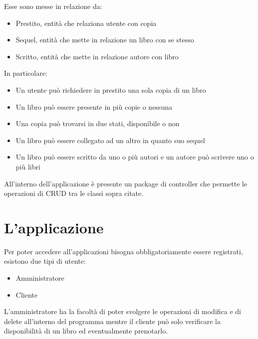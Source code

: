 \documentclass[a4paper,10pt]{article}
\begin{document}
Esse sono messe in relazione da:
\begin{itemize}
	\item Prestito, entità che relaziona utente con copia
	\item Sequel, entità che mette in relazione un libro con se stesso
	\item Scritto, entità che mette in relazione autore con libro
\end{itemize}

In particolare:
\begin{itemize}
	\item Un utente può richiedere in prestito una sola copia di un libro
	\item Un libro può essere presente in più copie o nessuna
	\item Una copia può trovarsi in due stati, disponibile o non
	\item Un libro può essere collegato ad un altro in quanto suo sequel
	\item Un libro può essere scritto da uno o più autori e un autore può scrivere uno o più libri
\end{itemize}

All’interno dell’applicazione è presente un package di controller che permette le operazioni di CRUD tra le classi sopra citate.

\section*{L'applicazione}
Per poter accedere all’applicazioni bisogna obbligatoriamente essere registrati, esistono due tipi di utente:

\begin{itemize}
	\item Amministratore
	\item Cliente
\end{itemize}

L’amministratore ha la facoltà di poter svolgere le operazioni di modifica e di delete all’interno del programma mentre il cliente può solo verificare la disponibilità di un libro ed eventualmente prenotarlo.
\end{document}
